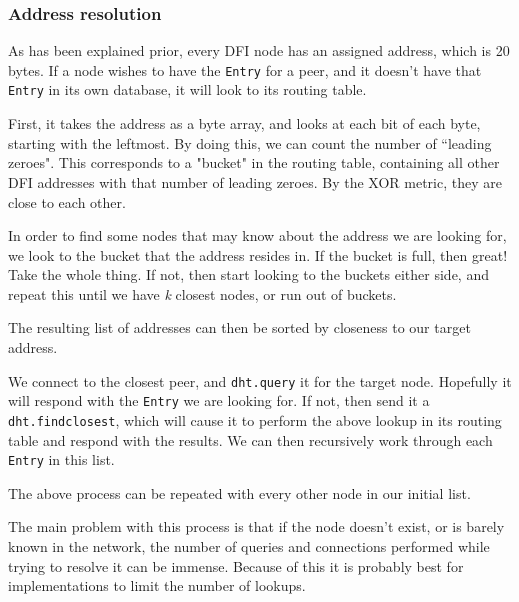 		\subsubsection{Address resolution}
		\label{sec:addrres}
		\begin{multicols}{2}
		As has been explained prior, every DFI node has an assigned address,
		which is 20 bytes. If a node wishes to have the \texttt{Entry} for a peer, and
		it doesn't have that \texttt{Entry} in its own database, it will look to its
		routing table. 


		First, it takes the address as a byte array, and looks at each bit of
		each byte, starting with the leftmost. By doing this, we can count the
		number of ``leading zeroes". This corresponds to a "bucket" in the
		routing table, containing all other DFI addresses with that number of
		leading zeroes. By the XOR metric, they are close to each other.

		In order to find some nodes that may know about the address we are
		looking for, we look to the bucket that the address resides in. If the
		bucket is full, then great! Take the whole thing. If not, then start
		looking to the buckets either side, and repeat this until we have
		\textit{k} closest nodes, or run out of buckets.

		The resulting list of addresses can then be sorted by closeness to our
		target address.

		We connect to the closest peer, and \texttt{dht.query} it for the
		target node. Hopefully it will respond with the \texttt{Entry} we are looking
		for. If not, then send it a \texttt{dht.findclosest}, which will cause
		it to perform the above lookup in its routing table and respond with the
		results. We can then recursively work through each \texttt{Entry} in this list.

		The above process can be repeated with every other node in our initial
		list.

		The main problem with this process is that if the node doesn't exist, or
		is barely known in the network, the number of queries and connections
		performed while trying to resolve it can be immense. Because of this it
		is probably best for implementations to limit the number of lookups.
	\end{multicols}

	\newpage
